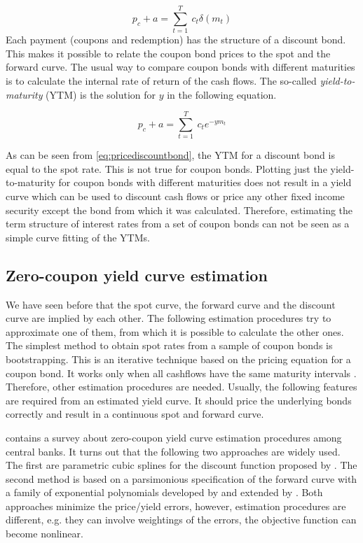 \begin{equation}
  \label{bondprceq2}
  p_c+a=\sum_{t=1}^T \ c_t \delta(m_t) 
\end{equation}
Each payment (coupons and redemption) has the structure of a discount bond. This makes it possible to relate the coupon bond prices to the spot and the forward curve. The usual way to compare coupon bonds with different maturities is to calculate the internal rate of return of the cash flows. The so-called \emph{yield-to-maturity} (YTM) is the solution for $y$ in the following equation.

\begin{equation}
   \label{eq:yield}
   p_c+a=\sum_{t=1}^T \ c_t e^{-ym_t}
 \end{equation}

As can be seen from \eqref{eq:pricediscountbond}, the YTM for a discount bond is equal to the spot rate. This is not true for coupon bonds. Plotting just the yield-to-maturity for coupon bonds with different maturities does not result in a yield curve which can be used to discount cash flows or price any other fixed income security except the bond from which it was calculated. Therefore, estimating the term structure of interest rates from a set of coupon bonds can not be seen as a simple curve fitting of the YTMs.

\subsection{Zero-coupon yield curve estimation}

We have seen before that the spot curve, the forward curve and the discount curve are implied by each other. The following estimation procedures try to approximate one of them, from which it is possible to calculate the other ones. The simplest method to obtain spot rates from a sample of coupon bonds is bootstrapping. This is an iterative technique based on the pricing equation for a coupon bond. It works only when all cashflows have the same maturity intervals \citep[see, e.g.][]{Hagan2006}. Therefore, other estimation procedures are needed. Usually, the following features are required from an estimated yield curve. It should price the underlying bonds correctly and result in a continuous spot and forward curve. 

\cite{BIS2005} contains a survey about zero-coupon yield curve estimation procedures among central banks. It turns out that the following two approaches are widely used. The first are parametric cubic splines for the discount function proposed by \cite{McCulloch1971, McCulloch1975}. The second method is based on a parsimonious specification of the forward curve with a family of exponential polynomials developed by \cite{Nelson1987} and extended by \cite{Svensson1994}. Both approaches minimize the price/yield errors, however, estimation procedures are different, e.g. they can involve weightings of the errors, the objective function can become nonlinear.

